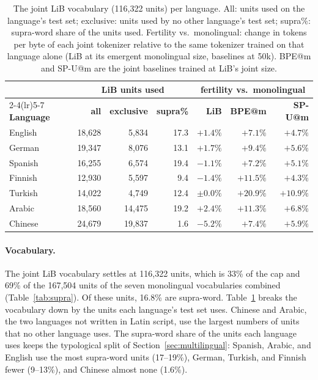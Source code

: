 \documentclass[pdflatex,sn-apa]{sn-jnl}
\begin{document}
\begin{table}[t]
\centering
\small
\begin{tabular}{lrrrrrr}
\toprule
& \multicolumn{3}{c}{\textbf{LiB units used}} &
\multicolumn{3}{c}{\textbf{fertility vs.\ monolingual}} \\
\cmidrule(lr){2-4}\cmidrule(lr){5-7}
\textbf{Language} & \textbf{all} & \textbf{exclusive} & \textbf{supra\%} &
\textbf{LiB} & \textbf{BPE@m} & \textbf{SP-U@m} \\
\midrule
English  & 18,628 &  5,834 & 17.3 & $+1.4\%$ & $+7.1\%$  & $+4.7\%$ \\
German   & 19,347 &  8,076 & 13.1 & $+1.7\%$ & $+9.4\%$  & $+5.6\%$ \\
Spanish  & 16,255 &  6,574 & 19.4 & $-1.1\%$ & $+7.2\%$  & $+5.1\%$ \\
Finnish  & 12,930 &  5,597 &  9.4 & $-1.4\%$ & $+11.5\%$ & $+4.3\%$ \\
Turkish  & 14,022 &  4,749 & 12.4 & $\pm0.0\%$ & $+20.9\%$ & $+10.9\%$ \\
Arabic   & 18,560 & 14,475 & 19.2 & $+2.4\%$ & $+11.3\%$ & $+6.8\%$ \\
Chinese  & 24,679 & 19,837 &  1.6 & $-5.2\%$ & $+7.4\%$  & $+5.9\%$ \\
\bottomrule
\end{tabular}
\caption{The joint LiB vocabulary (116,322 units) per language. All: units
used on the language's test set; exclusive: units used by no other language's
test set; supra\%: supra-word share of the units used. Fertility vs.\
monolingual: change in tokens per byte of each joint tokenizer relative to
the same tokenizer trained on that language alone (LiB at its emergent
monolingual size, baselines at 50k). BPE@m and SP-U@m are the joint baselines
trained at LiB's joint size.}
\label{tab:joint_alloc}
\end{table}

\paragraph{Vocabulary.}
The joint LiB vocabulary settles at 116,322 units, which is 33\% of the cap
and 69\% of the 167,504 units of the seven monolingual vocabularies combined
(Table~\ref{tab:supra}). Of these units, 16.8\% are supra-word.
Table~\ref{tab:joint_alloc} breaks the vocabulary down by the units each
language's test set uses. Chinese and Arabic, the two languages not written
in Latin script, use the largest numbers of units that no other language
uses. The supra-word share of the units each language uses keeps the
typological split of Section~\ref{sec:multilingual}: Spanish, Arabic, and
English use the most supra-word units (17--19\%), German, Turkish, and
Finnish fewer (9--13\%), and Chinese almost none (1.6\%).
\end{document}

